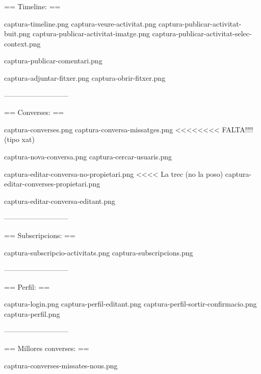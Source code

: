 
== Timeline: ==

captura-timeline.png
captura-veure-activitat.png
captura-publicar-activitat-buit.png
captura-publicar-activitat-imatge.png
captura-publicar-activitat-selec-context.png

captura-publicar-comentari.png

captura-adjuntar-fitxer.png
captura-obrir-fitxer.png

---------------------------

== Converses: ==

captura-converses.png
captura-conversa-missatges.png <<<<<<<< FALTA!!!! (tipo xat)

captura-nova-conversa.png
captura-cercar-usuaris.png

captura-editar-conversa-no-propietari.png	<<<< La trec (no la poso)
captura-editar-converses-propietari.png

captura-editar-conversa-editant.png

---------------------------

== Subscripcions: ==

captura-subscripcio-activitats.png
captura-subscripcions.png


---------------------------

== Perfil: ==

captura-login.png
captura-perfil-editant.png
captura-perfil-sortir-confirmacio.png
captura-perfil.png


---------------------------

== Millores converses: ==

captura-converses-missates-nous.png
